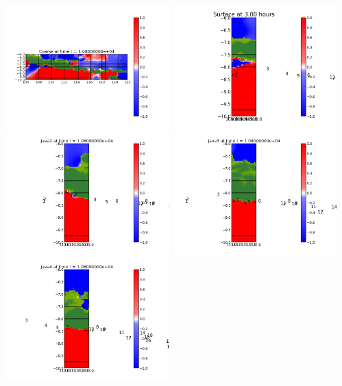 \documentclass[11pt]{article}
\begin{document}
\vskip 10pt 
\includegraphics[width=0.475\textwidth]{frame0012fig0.png}
\includegraphics[width=0.475\textwidth]{frame0012fig15.png}
\vskip 10pt 
\includegraphics[width=0.475\textwidth]{frame0012fig25.png}
\includegraphics[width=0.475\textwidth]{frame0012fig20.png}
\vskip 10pt 
\includegraphics[width=0.475\textwidth]{frame0012fig30.png}
\end{document}
